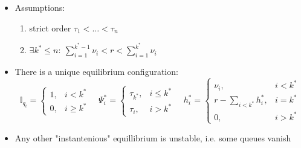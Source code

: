 \documentclass[10pt]{beamer}
\begin{document}
\begin{frame}

\begin{itemize}

\item Assumptions:
\begin{enumerate}
	\item strict order $ \tau_1 < \dots < \tau_n$
	\item $ \exists k^* \leq n: ~ \sum_{i=1}^{k^*-1} \nu_i < r < \sum_{i=1}^{k^*} \nu_i $
\end{enumerate}

 
\item There is a unique equilibrium configuration:
$$ \mathbb{I}_{q_i} = \begin{cases} 1 , &i < k^* \\ 0, &i \geq k^*  \end{cases}  \quad \Psi^*_i = \begin{cases} \tau_{k^*}, &i \leq k^* \\ \tau_i, &i > k^*  \end{cases} \quad h^*_i = \begin{cases} \nu_i, &i < k^* \\ r - \sum_{i < k^*} h^*_{i}, &i = k^*\\  0, &i > k^*  \end{cases} $$

\item Any other "instantenious" equillibrium is unstable, i.e. some queues  vanish

\end{itemize}


\end{frame}
\end{document}
